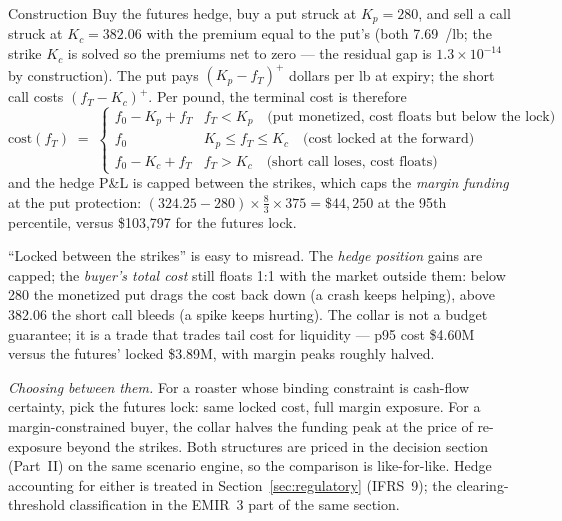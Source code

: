 \documentclass[11pt,a4paper]{article}
\newcommand{\usd}{\$}
\begin{document}
\begin{concept}{Construction}
Buy the futures hedge, buy a put struck at $K_p = 280$, and sell a call
struck at $K_c = 382.06$ with the premium equal to the put's (both
7.69~\textcent/lb; the strike $K_c$ is solved so the premiums net to zero
--- the residual gap is $1.3\times10^{-14}$ by construction). The put
pays $(K_p - f_T)^{+}$ dollars per lb at expiry; the short call costs
$(f_T - K_c)^{+}$. Per pound, the terminal cost is therefore
\[
  \text{cost}(f_T) \;=\;
  \begin{cases}
    f_0 - K_p + f_T & f_T < K_p \quad \text{(put monetized, cost floats but
      below the lock)}\\[2pt]
    f_0 & K_p \leq f_T \leq K_c \quad \text{(cost locked at the forward)}\\[2pt]
    f_0 - K_c + f_T & f_T > K_c \quad \text{(short call loses, cost floats)}
  \end{cases}
\]
and the hedge P\&L is capped between the strikes, which caps the
\emph{margin funding} at the put protection:
$(324.25 - 280)\times \tfrac{8}{3}\times 375 = \usd{}44{,}250$ at the
95th percentile, versus \usd{}103{,}797 for the futures lock.
\end{concept}

\begin{pitfall}
``Locked between the strikes'' is easy to misread. The \emph{hedge
position} gains are capped; the \emph{buyer's total cost} still floats
1:1 with the market outside them: below 280 the monetized put drags the
cost back down (a crash keeps helping), above 382.06 the short call
bleeds (a spike keeps hurting). The collar is not a budget guarantee; it
is a trade that trades tail cost for liquidity --- p95 cost \usd{}4.60M
versus the futures' locked \usd{}3.89M, with margin peaks roughly halved.
\end{pitfall}

\emph{Choosing between them.} For a roaster whose binding constraint is
cash-flow certainty, pick the futures lock: same locked cost, full margin
exposure. For a margin-constrained buyer, the collar halves the funding
peak at the price of re-exposure beyond the strikes. Both structures are
priced in the decision section (Part~II) on the same scenario engine, so
the comparison is like-for-like. Hedge accounting for either is treated
in Section~\ref{sec:regulatory} (IFRS~9); the clearing-threshold
classification in the EMIR~3 part of the same section.
\end{document}
